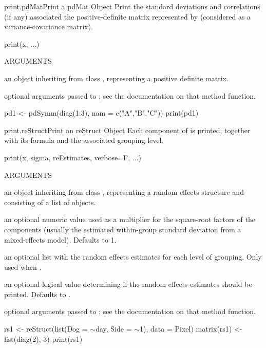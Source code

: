\documentclass[pdftex]{article} \usepackage{url,graphicx}
\renewcommand{\Twiddle}{\mbox{\(\sim\)}}
\begin{document}
\begin{Helpfile}{print.pdMat}{Print a pdMat Object}
Print the standard deviations and correlations (if any) associated the
positive-definite matrix represented by  (considered as a
variance-covariance matrix).
\begin{Example}
print(x, ...)
\end{Example}
\begin{Argument}{ARGUMENTS}
\item[\Co{object:}]
an object inheriting from class , representing
a positive definite matrix.
\item[\Co{...:}]
optional arguments passed to ; see
the documentation on that method function.
\end{Argument}
\need 15pt
\vspace{-16pt} 
\begin{Example}
pd1 <- pdSymm(diag(1:3), nam = c("A","B","C"))
print(pd1)
\end{Example}
\end{Helpfile}
\begin{Helpfile}{print.reStruct}{Print an reStruct Object}
Each  component of  is printed, together with
its formula and the associated grouping level.
\begin{Example}
print(x, sigma, reEstimates, verbose=F, ...)
\end{Example}
\begin{Argument}{ARGUMENTS}
\item[\Co{x:}]
an object inheriting from class ,
representing a random effects structure and consisting of a list of
 objects.
\item[\Co{sigma:}]
an optional numeric value used as a multiplier for
the square-root factors of the  components (usually the
estimated within-group standard deviation from a mixed-effects
model). Defaults to 1.
\item[\Co{reEstimates:}]
an optional list with the random effects estimates
for each level of grouping. Only used when .
\item[\Co{verbose:}]
an optional logical value determining if the random
effects estimates should be printed. Defaults to .
\item[\Co{...:}]
optional arguments passed to ; see
the documentation on that method function.
\end{Argument}
\need 15pt
\vspace{-16pt} 
\begin{Example}
rs1 <- reStruct(list(Dog = \Twiddle day, Side = \Twiddle 1), data = Pixel)
matrix(rs1) <- list(diag(2), 3)
print(rs1)
\end{Example}
\end{Helpfile}
\end{document}
